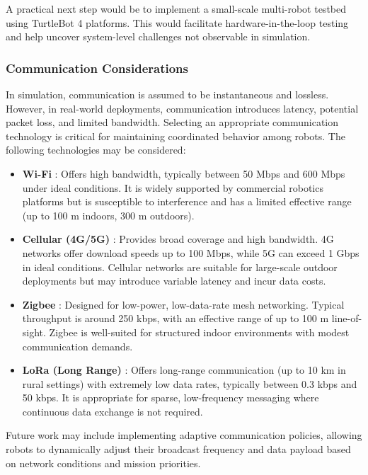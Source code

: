A practical next step would be to implement a small-scale multi-robot testbed using TurtleBot 4 platforms. This would facilitate hardware-in-the-loop testing and help uncover system-level challenges not observable in simulation.

\subsubsection{Communication Considerations}
\label{sub:communication-methods}

In simulation, communication is assumed to be instantaneous and lossless. However, in real-world deployments, communication introduces latency, potential packet loss, and limited bandwidth. Selecting an appropriate communication technology is critical for maintaining coordinated behavior among robots. The following technologies may be considered:

\begin{itemize}
  \item \textbf{Wi-Fi} \cite{wifi}: Offers high bandwidth, typically between 50 Mbps and 600 Mbps under ideal conditions. It is widely supported by commercial robotics platforms but is susceptible to interference and has a limited effective range (up to 100 m indoors, 300 m outdoors).
  \item \textbf{Cellular (4G/5G)} \cite{cellular}: Provides broad coverage and high bandwidth. 4G networks offer download speeds up to 100 Mbps, while 5G can exceed 1 Gbps in ideal conditions. Cellular networks are suitable for large-scale outdoor deployments but may introduce variable latency and incur data costs.
  \item \textbf{Zigbee} \cite{zigbee}: Designed for low-power, low-data-rate mesh networking. Typical throughput is around 250 kbps, with an effective range of up to 100 m line-of-sight. Zigbee is well-suited for structured indoor environments with modest communication demands.
  \item \textbf{LoRa (Long Range)} \cite{lora}: Offers long-range communication (up to 10 km in rural settings) with extremely low data rates, typically between 0.3 kbps and 50 kbps. It is appropriate for sparse, low-frequency messaging where continuous data exchange is not required.
\end{itemize}

Future work may include implementing adaptive communication policies, allowing robots to dynamically adjust their broadcast frequency and data payload based on network conditions and mission priorities.


